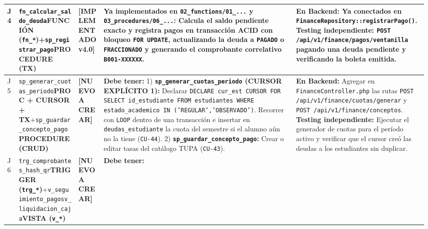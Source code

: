 \documentclass[10pt,a4paper,landscape]{article}
\newcommand{\stListo}{\textbf{\textcolor{teal!80!black}{[IMPLEMENTADO v4.0]}}}
\newcommand{\stNuevo}{\textbf{\textcolor{red!75!black}{[NUEVO A CREAR]}}}
\newcommand{\objProcTx}{\textbf{\textcolor{unjbgNavy}{PROCEDURE (TX)}}}
\newcommand{\objProcCrud}{\textbf{\textcolor{unjbgBlue}{PROCEDURE (CRUD)}}}
\newcommand{\objFunc}{\textbf{\textcolor{teal!80!black}{FUNCIÓN (\texttt{fn\_*})}}}
\newcommand{\objTrig}{\textbf{\textcolor{orange!80!black}{TRIGGER (\texttt{trg\_*})}}}
\newcommand{\objView}{\textbf{\textcolor{violet!85!black}{VISTA (\texttt{v\_*})}}}
\newcommand{\objCursor}{\textbf{\textcolor{red!75!black}{PROC + CURSOR + TX}}}
\begin{document}
\begin{longtable}{|p{0.5cm}|p{3.8cm}|p{2.9cm}|p{8.8cm}|p{9.2cm}|}
\rowcolor{rowAlt}
J4 & \texttt{fn\_calcular\_saldo\_deuda}\newline \objFunc\newline +\newline \texttt{sp\_registrar\_pago}\newline \objProcTx & \stListo & 
\textbf{Ya implementados en \texttt{02\_functions/01\_...} y \texttt{03\_procedures/06\_...}:}
Calcula el saldo pendiente exacto y registra pagos en transacción ACID con bloqueo \texttt{FOR UPDATE}, actualizando la deuda a \texttt{PAGADO} o \texttt{FRACCIONADO} y generando el comprobante correlativo \texttt{B001-XXXXXX}. & 
\textbf{En Backend:} Ya conectados en \texttt{FinanceRepository::registrarPago()}.\newline
\textbf{Testing independiente:} \texttt{POST /api/v1/finance/pagos/ventanilla} pagando una deuda pendiente y verificando la boleta emitida. \\
\hline
J5 & \texttt{sp\_generar\_cuotas\_periodo}\newline \objCursor\newline +\newline \texttt{sp\_guardar\_concepto\_pago}\newline \objProcCrud & \stNuevo & 
\textbf{Debe tener:}
1) \textbf{\texttt{sp\_generar\_cuotas\_periodo} (CURSOR EXPLÍCITO 1):} Declarar \texttt{DECLARE cur\_est CURSOR FOR SELECT id\_estudiante FROM estudiantes WHERE estado\_academico IN ('REGULAR','OBSERVADO')}. Recorrer con \texttt{LOOP} dentro de una transacción e insertar en \texttt{deudas\_estudiante} la cuota del semestre si el alumno aún no la tiene (\texttt{CU-44}).
2) \textbf{\texttt{sp\_guardar\_concepto\_pago}:} Crear o editar tasas del catálogo TUPA (\texttt{CU-43}). & 
\textbf{En Backend:} Agregar en \texttt{FinanceController.php} las rutas \texttt{POST /api/v1/finance/cuotas/generar} y \texttt{POST /api/v1/finance/conceptos}.\newline
\textbf{Testing independiente:} Ejecutar el generador de cuotas para el período activo y verificar que el cursor creó las deudas a los estudiantes sin duplicar. \\
\hline
\rowcolor{rowAlt}
J6 & \texttt{trg\_comprobantes\_hash\_qr}\newline \objTrig\newline +\newline \texttt{v\_seguimiento\_pagos}\newline \texttt{v\_liquidacion\_caja}\newline \objView & \stNuevo & 
\textbf{Debe tener:}

\end{longtable}
\end{document}
